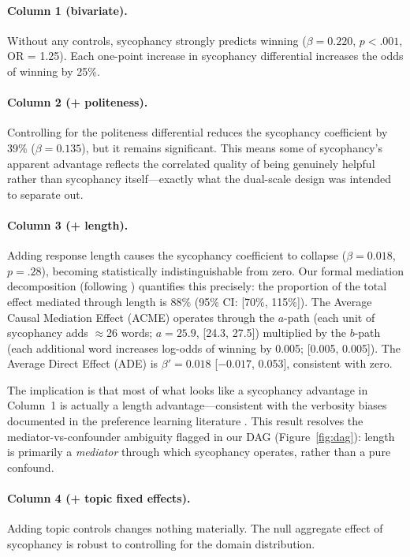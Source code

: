 \documentclass[11pt,twocolumn,a4paper]{article}
\begin{document}
\paragraph{Column 1 (bivariate).} Without any controls, sycophancy
strongly predicts winning ($\beta = 0.220$, $p < .001$, OR = 1.25).
Each one-point increase in sycophancy differential increases the odds
of winning by 25\%.

\paragraph{Column 2 (+ politeness).} Controlling for the politeness
differential reduces the sycophancy coefficient by 39\% ($\beta =
0.135$), but it remains significant. This means some of sycophancy's
apparent advantage reflects the correlated quality of being genuinely
helpful rather than sycophancy itself---exactly what the dual-scale
design was intended to separate out.

\paragraph{Column 3 (+ length).} Adding response length causes the
sycophancy coefficient to collapse ($\beta = 0.018$, $p = .28$),
becoming statistically indistinguishable from zero. Our formal
mediation decomposition (following \citealt{imai2010general})
quantifies this precisely: the proportion of the total effect mediated
through length is 88\% (95\% CI: [70\%, 115\%]). The Average Causal
Mediation Effect (ACME) operates through the $a$-path (each unit of
sycophancy adds $\approx$26 words; $a = 25.9$, [24.3, 27.5]) multiplied
by the $b$-path (each additional word increases log-odds of winning by
0.005; [0.005, 0.005]). The Average Direct Effect (ADE) is $\beta' =
0.018$ [$-0.017$, 0.053], consistent with zero.

The implication is that most of what looks like a sycophancy advantage
in Column~1 is actually a length advantage---consistent with the
verbosity biases documented in the preference learning literature
\citep{dubois2024alpacafarm}. This result resolves the
mediator-vs-confounder ambiguity flagged in our DAG
(Figure~\ref{fig:dag}): length is primarily a \emph{mediator} through
which sycophancy operates, rather than a pure confound.

\paragraph{Column 4 (+ topic fixed effects).} Adding topic controls
changes nothing materially. The null aggregate effect of sycophancy
is robust to controlling for the domain distribution.
\end{document}
